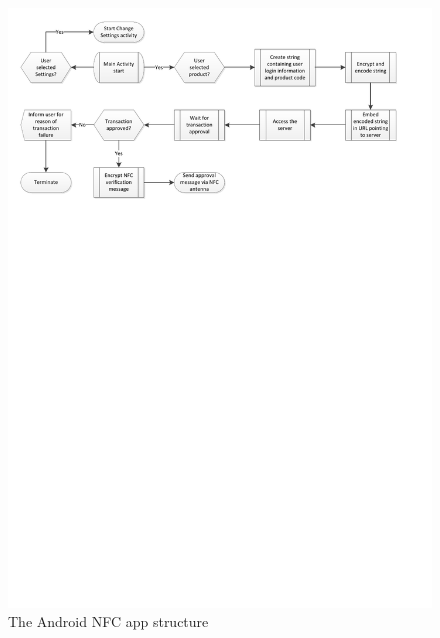 \begin{figure}
 \centering 
 \includegraphics[clip = true, trim = 0 550 0 0,
 scale=0.75]{app_main_processflow}
 \caption{The Android NFC app structure}
 \label{fig:app-welcomescreen}
\end{figure}

